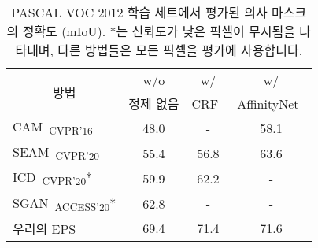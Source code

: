 \begin{table}[]
\centering
{\small
\begin{tabular}{@{}lccc@{}}
\toprule
\multicolumn{1}{c}{\multirow{2}{*}{방법}}         & w/o           & w/ &                                  w/ \\
                                                    & 정제 없음    & CRF~\cite{krahenbuhl2011efficient}    & AffinityNet~\cite{ahn2018learning}    \\ \midrule
\multicolumn{1}{l}{CAM~\cite{zhou2016learning}\textsubscript{CVPR'16}}     & 48.0          & -                                     & 58.1                                  \\
\multicolumn{1}{l}{SEAM~\cite{wang2020self}\textsubscript{CVPR'20}}        & 55.4          & 56.8                                  & 63.6                                  \\
\multicolumn{1}{l}{ICD~\cite{chen2020boundary}\textsubscript{CVPR'20}*}     & 59.9          & 62.2                                  & -                                     \\
\multicolumn{1}{l}{SGAN~\cite{yao2020saliency}\textsubscript{ACCESS'20}*}     & 62.8          & -                                     & -                                     \\
\multicolumn{1}{l}{우리의 EPS}                            & 69.4          & 71.4                                  & 71.6                                  \\ \bottomrule
\end{tabular}
}
\vspace{2mm}
\caption{PASCAL VOC 2012 학습 세트에서 평가된 의사 마스크의 정확도 (mIoU). *는 신뢰도가 낮은 픽셀이 무시됨을 나타내며, 다른 방법들은 모든 픽셀을 평가에 사용합니다.} \vspace{-3mm}
\label{tab:refinement}
\end{table}
